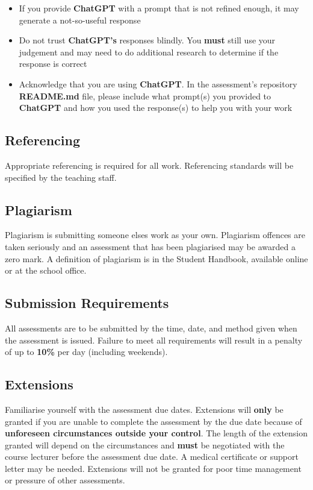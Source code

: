 \documentclass{article}
\begin{document}
\begin{itemize}
    \item If you provide \textbf{ChatGPT} with a prompt that is not refined enough, it may generate a not-so-useful response
    \item Do not trust \textbf{ChatGPT's} responses blindly. You \textbf{must} still use your judgement and may need to do additional research to determine if the response is correct
    \item Acknowledge that you are using \textbf{ChatGPT}. In the assessment's repository \textbf{README.md} file, please include what prompt(s) you provided to \textbf{ChatGPT} and how you used the response(s) to help you with your work
\end{itemize}

\subsection*{Referencing}
Appropriate referencing is required for all work. Referencing standards will be specified by the teaching staff.

\subsection*{Plagiarism}
Plagiarism is submitting someone elses work as your own. Plagiarism offences are taken seriously and an assessment that has been plagiarised may be awarded a zero mark. A definition of plagiarism is in the Student Handbook, available online or at the school office.

\subsection*{Submission Requirements}
All assessments are to be submitted by the time, date, and method given when the assessment is issued. Failure to meet all requirements will result in a penalty of up to \textbf{10\%} per day (including weekends).

\subsection*{Extensions}
Familiarise yourself with the assessment due dates. Extensions will \textbf{only} be granted if you are unable to complete the assessment by the due date because of \textbf{unforeseen circumstances outside your control}. The length of the extension granted will depend on the circumstances and \textbf{must} be negotiated with the course lecturer before the assessment due date. A medical certificate or support letter may be needed. Extensions will not be granted for poor time management or pressure of other assessments.
\end{document}
